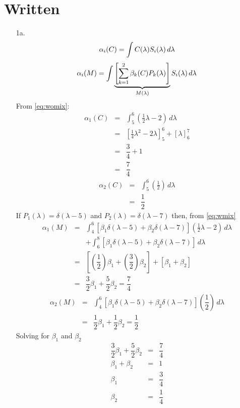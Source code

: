 \documentclass[10pt, a4paper]{article}
\begin{document}

\section{Written}
\begin{enumerate}
  \item[1a. ]
    \begin{equation} \label{eq:womix}
      \alpha_i(C) = \int C(\lambda) S_{i}(\lambda)\, d\lambda \\
    \end{equation}
    \begin{equation} \label{eq:wmix}
      \alpha_i(M) = \int \underbrace{\left[\sum_{k=1}^{2}\beta_{k}(C)P_{k}(\lambda) \right]}_{M(\lambda)}S_i(\lambda)\, d\lambda \\
    \end{equation}
    From \eqref{eq:womix}:
    \begin{eqnarray}
      \alpha_1(C) &=& \int^{6}_{5} \left( \frac{1}{2}\lambda -2 \right) \, d\lambda \\
      &=& \left[\frac{1}{4}\lambda^{2} - 2\lambda \right]^{6}_{5} + \left[\lambda \right]^{7}_{6} \\
      &=& \dfrac{3}{4} + 1 \\
      &=& \dfrac{7}{4}
    \end{eqnarray}
    \begin{eqnarray}
      \alpha_2(C) &=& \int^6_5 \left(\frac{1}{2}\right) \, d\lambda \\
      &=& \dfrac{1}{2}
    \end{eqnarray}
    If
    $P_1(\lambda) = \delta (\lambda-5)$
    and
    $P_2(\lambda) = \delta (\lambda-7)$
    then, from \eqref{eq:wmix}
    \begin{eqnarray}
      \alpha_1(M) &=& \int^6_4 \left[\beta_1\delta(\lambda-5) + \beta_2\delta(\lambda-7)\right]\left(\frac{1}{2}\lambda-2\right)\,
      d\lambda \\
      && + \int^8_6\left[\beta_1\delta(\lambda-5) + \beta_2\delta(\lambda-7)\right]\,d\lambda \nonumber \\
      &=& \left[\left(\dfrac{1}{2}\right)\beta_1 + \left(\dfrac{3}{2}\right)\beta_2\right] + \left[\beta_1 + \beta_2 \right] \\
      &=& \dfrac{3}{2}\beta_1 + \dfrac{5}{2}\beta_2 = \dfrac{7}{4}
    \end{eqnarray}
    \begin{eqnarray}
      \alpha_2(M) &=& \int^6_4\left[\beta_1\delta(\lambda-5) + \beta_2\delta(\lambda-7)\right]\left(\dfrac{1}{2}\right)\,d\lambda \\
      &=& \dfrac{1}{2}\beta_1 + \dfrac{1}{2}\beta_2 = \dfrac{1}{2}
    \end{eqnarray}
    Solving for $\beta_1$ and $\beta_2$
    \begin{eqnarray}
      \dfrac{3}{2}\beta_1 + \dfrac{5}{2}\beta_2 &=& \dfrac{7}{4} \\  
      \beta_1 + \beta_2 &=& 1 \\
      \beta_1 &=& \dfrac{3}{4} \\
      \beta_2 &=& \dfrac{1}{4}
    \end{eqnarray}
\end{enumerate}
\end{document}
